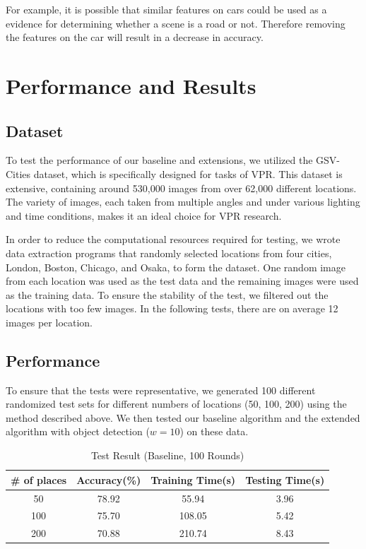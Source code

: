 \documentclass[conference]{IEEEtran}
\begin{document}
For example, it is possible that similar features on cars could be used as a evidence for determining whether a scene is a road or not. Therefore removing the features on the car will result in a decrease in accuracy.

\section{Performance and Results}

\subsection{Dataset}

To test the performance of our baseline and extensions, we utilized the GSV-Cities dataset\cite{ali2022gsv}, which is specifically designed for tasks of VPR. This dataset is extensive, containing around 530,000 images from over 62,000 different locations. The variety of images, each taken from multiple angles and under various lighting and time conditions, makes it an ideal choice for VPR research.

In order to reduce the computational resources required for testing, we wrote data extraction programs that randomly selected locations from four cities, London, Boston, Chicago, and Osaka, to form the dataset. One random image from each location was used as the test data and the remaining images were used as the training data. To ensure the stability of the test, we filtered out the locations with too few images. In the following tests, there are on average 12 images per location.

\subsection{Performance}

To ensure that the tests were representative, we generated 100 different randomized test sets for different numbers of locations (50, 100, 200) using the method described above. We then tested our baseline algorithm and the extended algorithm with object detection ($w = 10$) on these data.

\begin{table}[ht]
    \centering
    \caption{Test Result (Baseline, 100 Rounds)}
    \begin{tabular}{|c|c|c|c|}
    \hline \textbf{\# of places} & \textbf{Accuracy(\%)} & \textbf{Training Time(s)} & \textbf{Testing Time(s)}\\
    \hline 50 & 78.92 & 55.94 & 3.96\\
    \hline 100 & 75.70 & 108.05 & 5.42\\
    \hline 200 & 70.88 & 210.74 & 8.43\\
    \hline
    \end{tabular}
\end{table}
\end{document}
